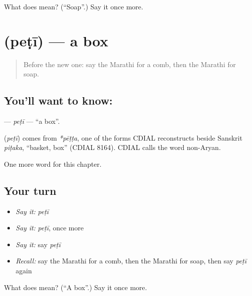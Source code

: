 \begin{tcolorbox}[breakable,colback=teal!4,colframe=teal!35!black,title={Before you move on}]
What does  mean? (\textquotedblleft{}Soap\textquotedblright{}.) Say it once more.
\end{tcolorbox}
\section[\texorpdfstring{\mr{पेटी} (peṭī)}{पेटी (peṭī)}]{ (peṭī) — a box}

\label{lesson:MR-C133-peti}



\begin{quote}
Before the new one: say the Marathi for a comb, then the Marathi for soap.
\end{quote}

\subsection*{You'll want to know: }
\textbf{} — \emph{peṭī} — \textquotedblleft{}a box\textquotedblright{}.

\begin{cousinweb}
\textbf{} (\emph{peṭī}) comes from \emph{*pēṭṭa}, one of the forms CDIAL reconstructs beside Sanskrit \emph{piṭaka}, \textquotedblleft{}basket, box\textquotedblright{} (CDIAL 8164). CDIAL calls the word non-Aryan.
\end{cousinweb}

\begin{grammarlens}[title={What you've built}]
One more word for this chapter.
\end{grammarlens}

\subsection*{Your turn}
\begin{itemize}
\raggedright
  \item \emph{Say it:} \emph{peṭī}
  \item \emph{Say it:} \emph{peṭī}, once more
  \item \emph{Say it:} say \emph{peṭī}
  \item \emph{Recall:} say the Marathi for a comb, then the Marathi for soap, then say \emph{peṭī} again
\end{itemize}

\begin{tcolorbox}[breakable,colback=teal!4,colframe=teal!35!black,title={Before you move on}]
What does  mean? (\textquotedblleft{}A box\textquotedblright{}.) Say it once more.
\end{tcolorbox}
